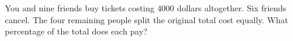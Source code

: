 You and nine friends buy tickets costing $4000$ dollars altogether. Six friends cancel. The four remaining people split the original total cost equally. What percentage of the total does each pay?
